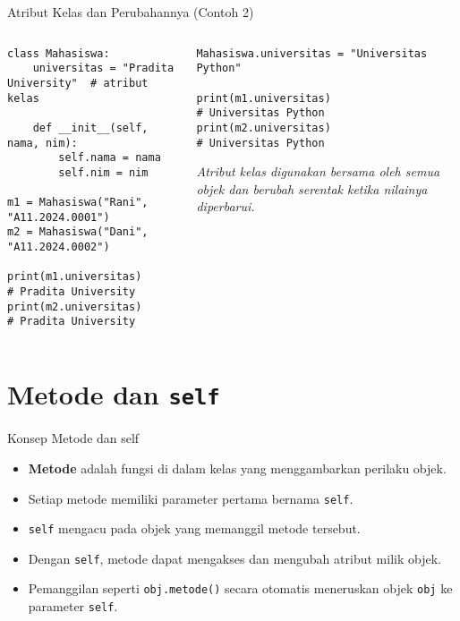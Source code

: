 \documentclass[aspectratio=169, table]{beamer}
\begin{document}
\begin{frame}[fragile]{Atribut Kelas dan Perubahannya (Contoh 2)}
\vspace{20pt}
\begin{columns}[T]
\begin{column}{0.55\textwidth}
\begin{lstlisting}[style=PythonStyle]
class Mahasiswa:
    universitas = "Pradita University"  # atribut kelas

    def __init__(self, nama, nim):
        self.nama = nama
        self.nim = nim

m1 = Mahasiswa("Rani", "A11.2024.0001")
m2 = Mahasiswa("Dani", "A11.2024.0002")

print(m1.universitas)  
# Pradita University
print(m2.universitas)  
# Pradita University
\end{lstlisting}
\end{column}

\begin{column}{0.4\textwidth}
\begin{lstlisting}[style=PythonStyle]
Mahasiswa.universitas = "Universitas Python"

print(m1.universitas)  
# Universitas Python
print(m2.universitas)  
# Universitas Python
\end{lstlisting}

\textit{Atribut kelas digunakan bersama oleh semua objek 
dan berubah serentak ketika nilainya diperbarui.}
\end{column}
\end{columns}
\end{frame}


\section{Metode dan \texttt{self}}

\begin{frame}[fragile]{Konsep Metode dan self}
\vspace{20pt}
\begin{itemize}
    \item \textbf{Metode} adalah fungsi di dalam kelas yang menggambarkan perilaku objek.
    \item Setiap metode memiliki parameter pertama bernama \texttt{self}.
    \item \texttt{self} mengacu pada objek yang memanggil metode tersebut.
    \item Dengan \texttt{self}, metode dapat mengakses dan mengubah atribut milik objek.
    \item Pemanggilan seperti \texttt{obj.metode()} secara otomatis meneruskan objek \texttt{obj} ke parameter \texttt{self}.
\end{itemize}
\end{frame}
\end{document}
